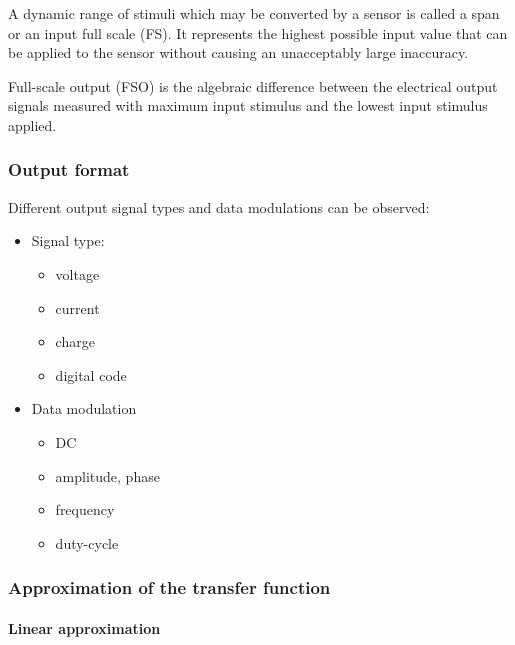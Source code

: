 A dynamic range of stimuli which may be converted by a sensor is called a span or an input full scale (FS). It represents the highest possible input value that can be applied to the sensor without causing an unacceptably large inaccuracy.


Full-scale output (FSO) is the algebraic difference between the electrical output signals measured with maximum input stimulus and the lowest input stimulus applied.

\subsubsection{Output format}
Different output signal types and data modulations can be observed:

\vspace{0.4cm}

\begin{minipage}[c]{.40\linewidth}	  
\begin{itemize}
    \item Signal type:
    \begin{itemize}
        \item voltage
        \item current
        \item charge
        \item digital code
    \end{itemize}
\end{itemize}
   \end{minipage} \hfill
   \begin{minipage}[c]{.52\linewidth}
   \begin{itemize}
    \item Data modulation
    \begin{itemize}
        \item DC
        \item amplitude, phase
        \item frequency
        \item duty-cycle
    \end{itemize}
\end{itemize}
   \end{minipage}
   
\subsubsection{Approximation of the transfer function}

\paragraph{Linear approximation}

